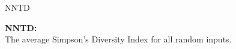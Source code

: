 \begin{frame}{NNTD}
\begin{center}
\textbf{NNTD:}\\
The average Simpson's Diversity Index for all random inputs.
\end{center}
\end{frame}





